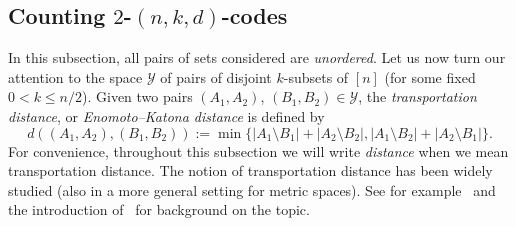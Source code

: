 \documentclass[11pt]{article}
\numberwithin{equation}{section}
\begin{document}







\subsection{Counting $2$-$(n,k,d)$-codes}
In this subsection, all pairs of sets considered are \emph{unordered}.
Let us now turn our attention to the space $\mathcal{Y}$ of  pairs of  disjoint $k$-subsets of $[n]$ (for some fixed $0<k \leq n/2$). 
 Given two pairs $(A_1,A_2)$, $(B_1,B_2) \in \mathcal Y$, the \emph{transportation distance}, or \emph{Enomoto--Katona distance}  is defined by $$d((A_1,A_2),(B_1,B_2)):=\min \{|A_1\setminus B_1|+|A_2 \setminus B_2|,|A_1\setminus B_2|+|A_2\setminus B_1|\}.$$
For convenience, throughout this subsection we will write \emph{distance} when we mean transportation distance.
The notion of transportation distance has been widely studied (also in a more general setting for metric spaces). See for example~\cite{vill} and the introduction of~\cite{bollobastransport} for background on the topic.
\end{document}
